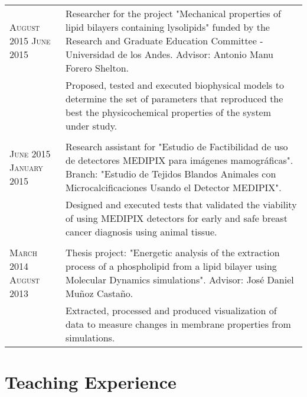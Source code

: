 \documentclass[a4paper,10pt]{article} %
\begin{document}
\begin{tabular}{p{2.4cm}p{11.7cm}}
\textsc{August 2015} \newline \textsc{June 2015} & Researcher for the project "Mechanical properties of lipid bilayers containing lysolipids" funded by the Research and Graduate Education Committee - Universidad de los Andes. Advisor: Antonio Manu Forero Shelton. \\
& Proposed, tested and executed biophysical models to determine the set of parameters that reproduced the best the physicochemical properties of the system under study. \\
\\
\textsc{June 2015} \newline \textsc{January 2015} & Research assistant for "Estudio de Factibilidad de uso de 
 detectores MEDIPIX para imágenes mamográficas". Branch: "Estudio de Tejidos Blandos Animales con Microcalciﬁcaciones Usando el Detector MEDIPIX". \\
& Designed and executed tests that validated the viability of using MEDIPIX detectors for early and safe breast cancer diagnosis using animal tissue.  \\
\\
\textsc{March 2014} \newline \textsc{August 2013} & Thesis project: "Energetic analysis of the  extraction process of a phospholipid
 from a lipid bilayer using Molecular Dynamics simulations". Advisor: Jos\'e Daniel Mu\~noz Casta\~no. \\
& Extracted, processed and produced visualization of data to measure changes in membrane properties from simulations.
\end{tabular}



\color{OrangeRed}
\section{Teaching Experience}
\color{black}
\end{document}
